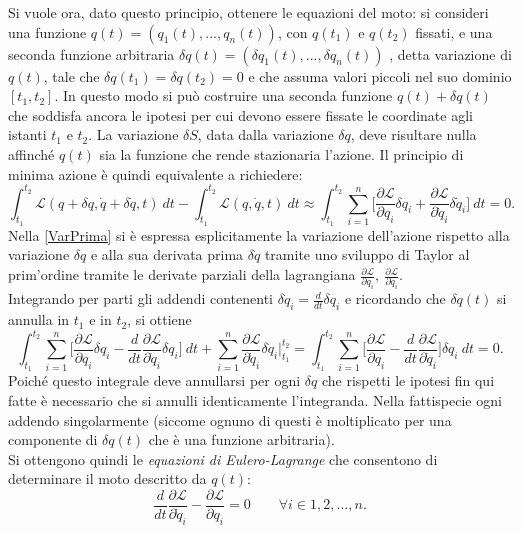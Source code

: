 Si vuole ora, dato questo principio, ottenere le equazioni del moto: si consideri una funzione $q(t)=(q_1(t),...,q_n(t))$, con $q(t_1)$ e $q(t_2)$ fissati, e una seconda funzione arbitraria $\delta q(t)=(\delta q_1(t),...,\delta q_n(t))$ , detta variazione di $q(t)$, tale che $\delta q (t_1)=\delta q(t_2)=0$ e che assuma valori piccoli nel suo dominio $[t_1,t_2]$. In questo modo si può costruire una seconda funzione $q(t)+\delta q(t)$ che soddisfa ancora le ipotesi per cui devono essere fissate le coordinate agli istanti $t_1$ e $ t_2$. 
La variazione $\delta S$, data dalla variazione $\delta q$, deve risultare nulla affinché $q(t)$ sia la funzione che rende stazionaria l'azione. Il principio di minima azione è quindi equivalente a richiedere:
\begin{equation}
    \int_{t_1}^{t_2} \mathcal{L}(q+\delta q,\dot{q}+\delta \dot{q},t)\ dt-\int_{t_1}^{t_2} \mathcal{L}(q,\dot{q},t)\ dt\approx\int_{t_1}^{t_2}\sum_{i=1}^{n}\bigg[\frac{\partial\mathcal{L} }{\partial q_i}\delta q_i+\frac{\partial\mathcal{L} }{\partial \dot{q}_i}\delta \dot{q}_i \bigg]\ dt=0.\label{VarPrima}
\end{equation}
Nella \eqref{VarPrima} si è espressa esplicitamente la variazione dell'azione rispetto alla variazione $\delta q$ e alla sua derivata prima $\delta \dot{q}$ tramite uno sviluppo di Taylor al prim'ordine tramite le derivate parziali della lagrangiana $\frac{\partial\mathcal{L} }{\partial q_i},\ \frac{\partial\mathcal{L} }{\partial \dot{q}_i}$.\\
Integrando per parti gli addendi contenenti $\delta \dot{q}_i=\frac{d}{dt}\delta q_i$ e ricordando che $\delta q (t)$ si annulla in $t_1$ e in $t_2$, si ottiene
\begin{equation*}
    \int_{t_1}^{t_2}\sum_{i=1}^{n}\bigg[\frac{\partial\mathcal{L} }{\partial q_i}\delta q_i-\frac{d}{dt}\frac{\partial\mathcal{L} }{\partial \dot{q}_i}\delta q_i \bigg]\ dt+\sum_{i=1}^n\frac{\partial\mathcal{L} }{\partial \dot q_i}\delta \dot{q}_i\bigg|_{t_1}^{t_2}=\int_{t_1}^{t_2}\sum_{i=1}^{n}\bigg[\frac{\partial\mathcal{L} }{\partial q_i}-\frac{d}{dt}\frac{\partial\mathcal{L} }{\partial \dot{q}_i} \bigg]\delta q_i\ dt=0.
\end{equation*}
Poiché questo integrale deve annullarsi per ogni $\delta q$ che rispetti le ipotesi fin qui fatte è necessario che si annulli identicamente l'integranda. Nella fattispecie ogni addendo singolarmente (siccome ognuno di questi è moltiplicato per una componente di $\delta q(t)$ che è una funzione arbitraria).\\Si ottengono quindi le \emph{equazioni di Eulero-Lagrange} che consentono di determinare il moto descritto da $q(t)$:
\begin{equation}
    \label{eulero-lagrange}
    \frac{d}{dt}\frac{\partial\mathcal{L} }{\partial \dot{q}_i}-\frac{\partial\mathcal{L} }{\partial q_i}=0 \qquad \forall i\in{1,2,...,n}.
\end{equation}

